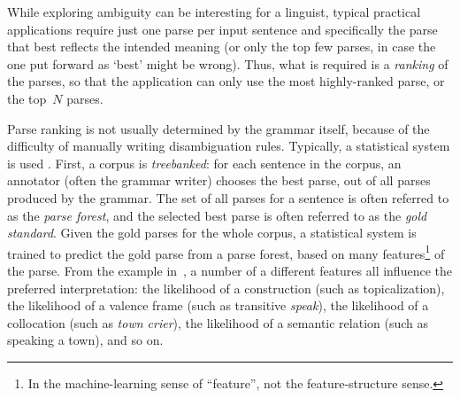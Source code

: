 \documentclass[output=paper,nonflat]{langsci/langscibook}
\begin{document}
While exploring ambiguity can be interesting for a linguist,
typical practical applications require just one parse per input sentence
and specifically the parse that best reflects the intended meaning
(or only the top few parses, in case the one put forward as `best' might be wrong).
Thus, what is required is a \textit{ranking} of the parses,
so that the application can only use the most highly-ranked parse,
or the top~$N$ parses.

Parse ranking is not usually determined by the grammar itself,
because of the difficulty of manually writing disambiguation rules.
Typically, a statistical system is used \citep{Tou:Man:Shi:Fli:Oep:02,Tou:Man:Fli:Oep:05}.
First, a corpus is \textit{treebanked}:
for each sentence in the corpus,
an annotator (often the grammar writer) chooses the best parse,
out of all parses produced by the grammar.
The set of all parses for a sentence is often referred to as the \textit{parse forest},
and the selected best parse is often referred to as the \textit{gold standard}.
Given the gold parses for the whole corpus, a statistical system is trained
to predict the gold parse from a parse forest,
based on many features\footnote{%
	In the machine-learning sense of ``feature'',
	not the feature-structure sense.
}
of the parse.
From the example in~,
a number of a different features all influence the preferred interpretation:
the likelihood of a construction (such as topicalization),
the likelihood of a valence frame (such as transitive \textit{speak}),
the likelihood of a collocation (such as \textit{town crier}),
the likelihood of a semantic relation (such as speaking a town),
and so on.
\end{document}
